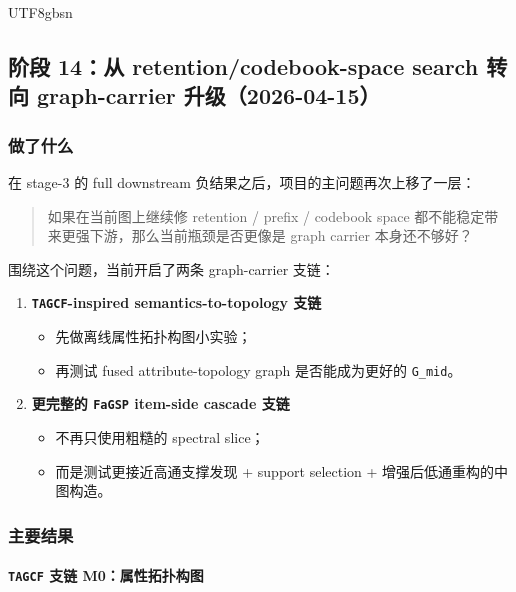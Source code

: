 \documentclass[11pt]{article}
\begin{document}
\begin{CJK*}{UTF8}{gbsn}
\subsection{阶段 14：从 retention/codebook-space search 转向 graph-carrier 升级（2026-04-15）}

\subsubsection*{做了什么}

在 stage-3 的 full downstream 负结果之后，项目的主问题再次上移了一层：

\begin{quote}
如果在当前图上继续修 retention / prefix / codebook space 都不能稳定带来更强下游，那么当前瓶颈是否更像是 graph carrier 本身还不够好？
\end{quote}

围绕这个问题，当前开启了两条 graph-carrier 支链：

\begin{enumerate}
  \item \textbf{\texttt{TAGCF}-inspired semantics-to-topology 支链}
  \begin{itemize}
    \item 先做离线属性拓扑构图小实验；
    \item 再测试 fused attribute-topology graph 是否能成为更好的 \texttt{G\_mid}。
  \end{itemize}
  \item \textbf{更完整的 \texttt{FaGSP} item-side cascade 支链}
  \begin{itemize}
    \item 不再只使用粗糙的 spectral slice；
    \item 而是测试更接近高通支撑发现 + support selection + 增强后低通重构的中图构造。
  \end{itemize}
\end{enumerate}

\subsubsection*{主要结果}

\paragraph{\texttt{TAGCF} 支链 M0：属性拓扑构图}


\end{CJK*}
\end{document}
